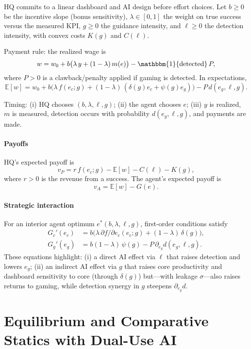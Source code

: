 \documentclass[11pt]{article}
\begin{document}
HQ commits to a linear dashboard and AI design before effort choices. Let $b\ge 0$ be the incentive slope (bonus sensitivity), $\lambda \in [0,1]$ the weight on true success versus the measured KPI, $g \ge 0$ the guidance intensity, and $\ell \ge 0$ the detection intensity, with convex costs $K(g)$ and $C(\ell)$.

Payment rule: the realized wage is
\[
w = w_0 + b\big( \lambda\, y + (1-\lambda)\, m(e) \big) - \mathbbm{1}\{\text{detected}\}\, P,
\]
where $P>0$ is a clawback/penalty applied if gaming is detected. In expectations,
\[
\mathbb{E}[w] = w_0 + b\Big( \lambda\, f(e_c; g) + (1-\lambda)\, (\delta(g) e_c + \psi(g) e_g) \Big) - P\, d(e_g,\ell,g).
\]

Timing: (i) HQ chooses $(b,\lambda,\ell,g)$; (ii) the agent chooses $e$; (iii) $y$ is realized, $m$ is measured, detection occurs with probability $d(e_g,\ell,g)$, and payments are made.

\paragraph{Payoffs}

HQ's expected payoff is
\[
v_P = r\, f(e_c; g) - \mathbb{E}[w] - C(\ell) - K(g),
\]
where $r>0$ is the revenue from a success. The agent's expected payoff is
\[
v_A = \mathbb{E}[w] - G(e).
\]

\paragraph{Strategic interaction}

For an interior agent optimum $e^*(b,\lambda,\ell,g)$, first-order conditions satisfy
\begin{align*}
G_c'(e_c) &= b\big( \lambda\, \partial f/\partial e_c (e_c; g) + (1-\lambda)\, \delta(g) \big), \\
G_g'(e_g) &= b(1-\lambda)\, \psi(g) - P\, \partial_{e_g} d(e_g,\ell,g).
\end{align*}
These equations highlight: (i) a direct AI effect via $\ell$ that raises detection and lowers $e_g$; (ii) an indirect AI effect via $g$ that raises core productivity and dashboard sensitivity to core (through $\delta(g)$) but—with leakage $\sigma$—also raises returns to gaming, while detection synergy in $g$ steepens $\partial_{e_g} d$.

\section{Equilibrium and Comparative Statics with Dual-Use AI}
\label{sec:eq}
\end{document}
